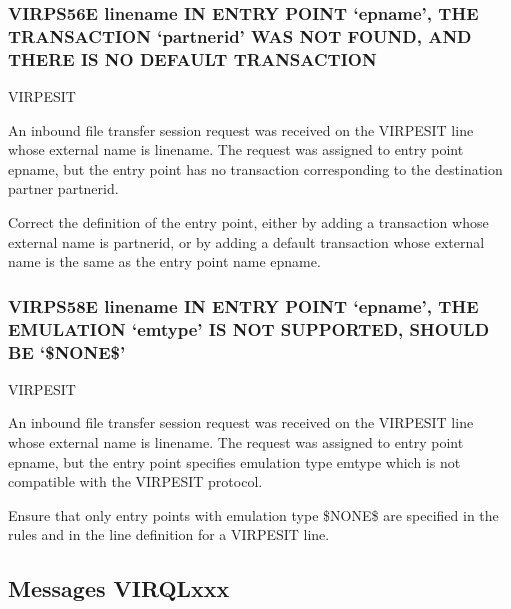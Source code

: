 \documentclass[letterpaper,10pt,english]{sphinxmanual}
\begin{document}
\subsubsection{VIRPS56E linename IN ENTRY POINT ‘epname’, THE TRANSACTION ‘partnerid’ WAS NOT FOUND, AND THERE IS NO DEFAULT TRANSACTION}
\label{\detokenize{messages:virps56e-linename-in-entry-point-epname-the-transaction-partnerid-was-not-found-and-there-is-no-default-transaction}}\begin{description}
\sphinxAtStartPar
VIRPESIT

\sphinxAtStartPar
An inbound file transfer session request was received on the VIRPESIT line whose external name is linename. The request was assigned to entry point epname, but the entry point has no transaction corresponding to the destination partner partnerid.

\sphinxAtStartPar
Correct the definition of the entry point, either by adding a transaction whose external name is partnerid, or by adding a default transaction whose external name is the same as the entry point name epname.

\end{description}


\subsubsection{VIRPS58E linename IN ENTRY POINT ‘epname’, THE EMULATION ‘emtype’ IS NOT SUPPORTED, SHOULD BE ‘\$NONE\$’}
\label{\detokenize{messages:virps58e-linename-in-entry-point-epname-the-emulation-emtype-is-not-supported-should-be-none}}\begin{description}
\sphinxAtStartPar
VIRPESIT

\sphinxAtStartPar
An inbound file transfer session request was received on the VIRPESIT line whose external name is linename. The request was assigned to entry point epname, but the entry point specifies emulation type emtype which is not compatible with the VIRPESIT protocol.

\sphinxAtStartPar
Ensure that only entry points with emulation type \$NONE\$ are specified in the rules and in the line definition for a VIRPESIT line.

\end{description}


\subsection{Messages VIRQLxxx}
\label{\detokenize{messages:messages-virqlxxx}}
\end{document}

